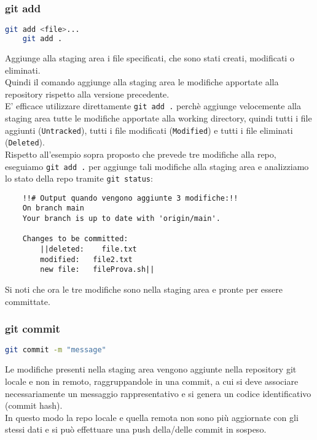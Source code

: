 \subsubsection{git add}
\begin{lstlisting}[language=bash]
	git add <file>...
	git add .
\end{lstlisting}
Aggiunge alla staging area i file specificati, che sono stati creati, modificati o eliminati.\\
Quindi il comando aggiunge alla staging area le modifiche apportate alla repository rispetto alla versione precedente.\\
E' efficace utilizzare direttamente \texttt{git add .} perchè aggiunge velocemente alla staging area tutte le modifiche apportate alla working directory, quindi tutti i file aggiunti (\texttt{Untracked}), tutti i file modificati (\texttt{Modified}) e tutti i file eliminati (\texttt{Deleted}).\vspace{.3cm}\\
Rispetto all'esempio sopra proposto che prevede tre modifiche alla repo, eseguiamo \texttt{git add .} per aggiunge tali modifiche alla staging area e analizziamo lo stato della repo tramite \texttt{git status}:
\begin{lstlisting}
	!!# Output quando vengono aggiunte 3 modifiche:!!
	On branch main
	Your branch is up to date with 'origin/main'.      
	
	Changes to be committed:
		||deleted:    file.txt
		modified:   file2.txt
		new file:   fileProva.sh||
\end{lstlisting}
Si noti che ora le tre modifiche sono nella staging area e pronte per essere committate.

\newpage
{}
\subsubsection{git commit}
\begin{lstlisting}[language=bash]
	git commit -m "message"
\end{lstlisting}
Le modifiche presenti nella staging area vengono aggiunte nella repository git locale e non in remoto, raggruppandole in una commit, a cui si deve associare necessariamente un messaggio rappresentativo e si genera un codice identificativo (commit hash).\\
In questo modo la repo locale e quella remota non sono più aggiornate con gli stessi dati e si può effettuare una push della/delle commit in sospeso.\\

